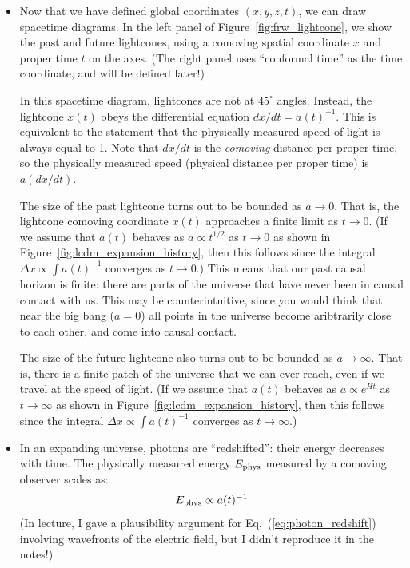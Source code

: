 \documentclass[aps,prd,superscriptaddress,groupedaddress,nofootinbib,nobibnotes]{revtex4}
\newcommand{\be}{\begin{equation}}
\newcommand{\ee}{\end{equation}}
\begin{document}
\begin{itemize}
\item
Now that we have defined global coordinates $(x,y,z,t)$, we can draw spacetime diagrams.
In the left panel of Figure~\ref{fig:frw_lightcone}, we show the past and future lightcones,
using a comoving spatial coordinate $x$ and proper time $t$ on the axes.
(The right panel uses ``conformal time'' as the time coordinate, and will be defined later!)

In this spacetime diagram, lightcones are not at $45^\circ$ angles.  Instead, the lightcone $x(t)$ obeys the
differential equation $dx/dt = a(t)^{-1}$.  This is equivalent to the statement that the physically measured
speed of light is always equal to 1.  Note that $dx/dt$ is the {\em comoving} distance per proper time, so the
physically measured speed (physical distance per proper time) is $a (dx/dt)$.

The size of the past lightcone turns out to be bounded as $a \rightarrow 0$.  That is, the lightcone
comoving coordinate $x(t)$ approaches a finite limit as $t \rightarrow 0$.  (If we assume that $a(t)$
behaves as $a \propto t^{1/2}$ as $t \rightarrow 0$ as shown in Figure~\ref{fig:lcdm_expansion_history},
then this follows since the integral $\Delta x \propto \int a(t)^{-1}$ converges as $t \rightarrow 0$.)
This means that our past causal horizon is finite: there are parts of the universe that have never been
in causal contact with us.  This may be counterintuitive, since you would think that near the big bang
($a=0$) all points in the universe become aribtrarily close to each other, and come into causal contact.

The size of the future lightcone also turns out to be bounded as $a \rightarrow \infty$.
That is, there is a finite patch of the universe that we can ever reach, even if we travel at the speed of light.
(If we assume that $a(t)$ behaves as $a \propto e^{Ht}$ as $t \rightarrow \infty$ as shown in Figure~\ref{fig:lcdm_expansion_history},
then this follows since the integral $\Delta x \propto \int a(t)^{-1}$ converges as $t \rightarrow \infty$.)

\item
In an expanding universe, photons are ``redshifted'': their energy decreases with time.
The physically measured energy $E_{\rm phys}$ measured by a comoving observer scales as:
\be
E_{\rm phys} \propto a(t)^{-1}  \label{eq:photon_redshift}
\ee
(In lecture, I gave a plausibility argument for Eq.~(\ref{eq:photon_redshift}) involving
wavefronts of the electric field, but I didn't reproduce it in the notes!)


\end{itemize}
\end{document}
